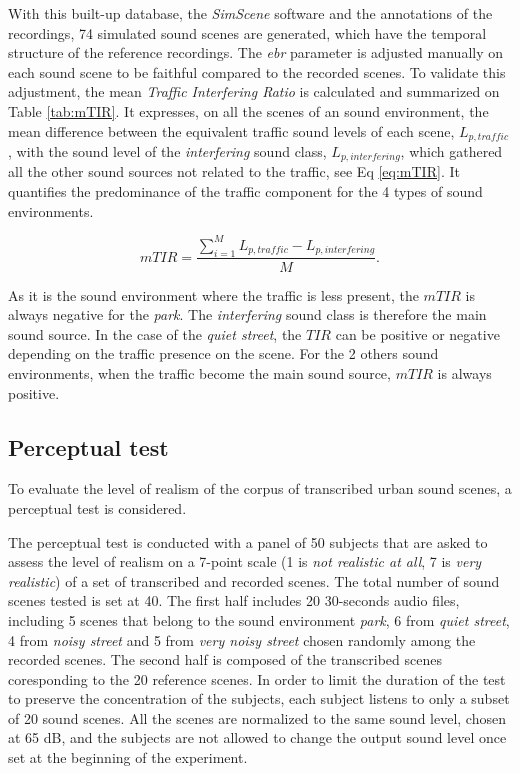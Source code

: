 \documentclass[review,5p,twocolumn,sort&compress,times]{elsarticle}
\begin{document}
With this built-up database, the \textit{SimScene} software and the annotations of the recordings, 74 simulated sound scenes are generated, which have the temporal structure of the reference recordings. The \textit{ebr} parameter is adjusted manually on each sound scene to be faithful compared to the recorded scenes. To validate this adjustment, the mean \textit{Traffic Interfering Ratio} is calculated and summarized on Table \ref{tab:mTIR}. It expresses, on all the scenes of an sound environment, the mean difference between the equivalent traffic sound levels of each scene, $L_{p,traffic}$, with the sound level of the \textit{interfering} sound class, $L_{p, interfering}$, which gathered all the other sound sources not related to the traffic, see Eq \ref{eq:mTIR}. It quantifies the predominance of the traffic component for the 4 types of sound environments.

\begin{equation}\label{eq:mTIR}
mTIR = \frac{\sum_{i = 1}^M L_{p,traffic} - L_{p, interfering}}{M}.
\end{equation}

As it is the sound environment where the traffic is less present, the $mTIR$ is always negative for the \textit{park}. The \textit{interfering} sound class is therefore the main sound source. In the case of the \textit{quiet street}, the $TIR$ can be positive or negative depending on the traffic presence on the scene. For the 2 others sound environments, when the traffic become the main sound source, $mTIR$ is always positive.

\subsection{Perceptual test}

To evaluate the level of realism of the corpus of transcribed urban sound scenes, a perceptual test is considered.

The perceptual test is conducted with a panel of 50 subjects that are asked to assess the level of realism on a 7-point scale (1 is \textit{not realistic at all}, 7 is \textit{very realistic}) of a set of transcribed and recorded scenes. The total number of sound scenes tested is set at 40. The first half includes 20 30-seconds audio files, including 5 scenes that belong to the sound environment \textit{park}, 6 from \textit{quiet street}, 4 from \textit{noisy street} and 5 from \textit{very noisy street} chosen randomly among the recorded scenes. The second half is composed of the transcribed scenes coresponding to the 20 reference scenes. In order to limit the duration of the test to preserve the concentration of the subjects, each subject listens to only a subset of 20 sound scenes. All the scenes are normalized to the same sound level, chosen at 65 dB, and the subjects are not allowed to change the output sound level once set at the beginning of the experiment.
\end{document}
